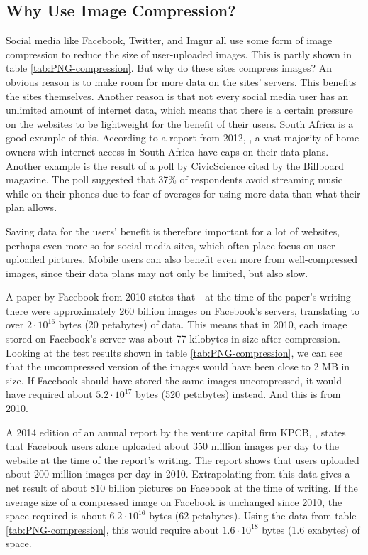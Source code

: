 \subsection{Why Use Image Compression?}
\label{sec:whycompression}
Social media like Facebook, Twitter, and Imgur all use some form of image compression to reduce the size of user-uploaded images.
This is partly shown in table \ref{tab:PNG-compression}.
But why do these sites compress images?
An obvious reason is to make room for more data on the sites' servers.
This benefits the sites themselves.
Another reason is that not every social media user has an unlimited amount of internet data, which means that there is a certain pressure on the websites to be lightweight for the benefit of their users.
South Africa is a good example of this.
According to a report from 2012, \citep{chetty_2012}, a vast majority of home-owners with internet access in South Africa have caps on their data plans.
Another example is the result of a poll by CivicScience \citep{tmobilemusic} cited by the Billboard magazine.
The poll suggested that 37\% of respondents avoid streaming music while on their phones due to fear of overages for using more data than what their plan allows.

Saving data for the users' benefit is therefore important for a lot of websites, perhaps even more so for social media sites, which often place focus on user-uploaded pictures.
Mobile users can also benefit even more from well-compressed images, since their data plans may not only be limited, but also slow.

A paper by Facebook from 2010 \citep{beaver2010} states that - at the time of the paper's writing - there were approximately 260 billion images on Facebook's servers, translating to over $2\cdot10^{16}$ bytes (20 petabytes) of data.
This means that in 2010, each image stored on Facebook's server was about 77 kilobytes in size after compression.
Looking at the test results shown in table \ref{tab:PNG-compression}, we can see that the uncompressed version of the images would have been close to 2 MB in size.
If Facebook should have stored the same images uncompressed, it would have required about $5.2\cdot10^{17}$ bytes (520 petabytes) instead.
And this is from 2010.

A 2014 edition of an annual report by the venture capital firm KPCB, \citep{meeker2014internet}, states that Facebook users alone uploaded about
350 million images per day to the website at the time of the report's writing.
The report shows that users uploaded about 200 million images per day in 2010.
Extrapolating from this data gives a net result of about 810 billion pictures on Facebook at the time of writing.
If the average size of a compressed image on Facebook is unchanged since 2010, the space required is about $6.2\cdot10^{16}$ bytes (62 petabytes).
Using the data from table \ref{tab:PNG-compression}, this would require about $1.6\cdot10^{18}$ bytes (1.6 exabytes) of space.

